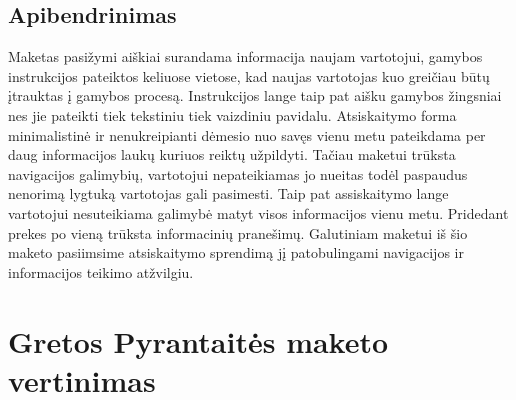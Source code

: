 \documentclass[oneside]{VUMIFPSkursinis}
\begin{document}
	\subsection{Apibendrinimas}
Maketas pasižymi aiškiai surandama informacija naujam vartotojui, gamybos instrukcijos pateiktos keliuose vietose, kad naujas vartotojas kuo greičiau būtų įtrauktas į gamybos procesą. Instrukcijos lange taip pat aišku gamybos žingsniai nes jie pateikti tiek tekstiniu tiek vaizdiniu pavidalu. Atsiskaitymo forma minimalistinė ir nenukreipianti dėmesio nuo savęs vienu metu pateikdama per daug informacijos laukų kuriuos reiktų užpildyti. Tačiau maketui trūksta navigacijos galimybių, vartotojui nepateikiamas jo nueitas todėl paspaudus nenorimą lygtuką vartotojas gali pasimesti. Taip pat assiskaitymo lange vartotojui nesuteikiama galimybė matyt visos informacijos vienu metu. Pridedant prekes po vieną trūksta informacinių pranešimų. Galutiniam maketui iš šio maketo pasiimsime atsiskaitymo sprendimą jį patobulingami navigacijos ir informacijos teikimo atžvilgiu.
\iffalse XXXXXXXXXXXXXXXXXXXXXXXXXXXXXXXXXXXXXXXXXXXXXXXXXXXXXXXXXXXXXXXXXXXXXXXXXXXXXXXXXXXXXXXXXXXXXXXXXXXXXXXXXXXXXXXXXXXXXXXXXXXXXXXXXXXXXXX \fi
\section{Gretos Pyrantaitės maketo vertinimas}
\end{document}
